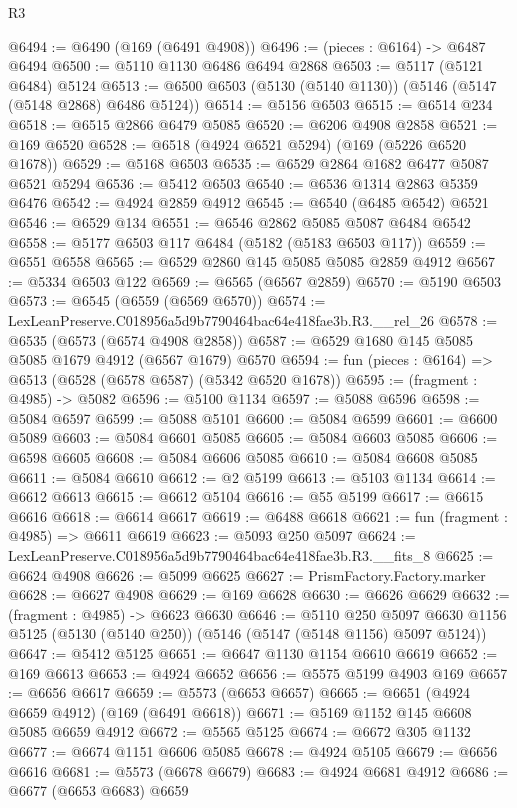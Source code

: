 \begin{lexlean}{R3}
\begin{coremodule}
@6494 := @6490 (@169 (@6491 @4908))
@6496 := (pieces : @6164) -> @6487 @6494
@6500 := @5110 @1130 @6486 @6494 @2868
@6503 := @5117 (@5121 @6484) @5124
@6513 := @6500 @6503 (@5130 (@5140 @1130)) (@5146 (@5147 (@5148 @2868) @6486 @5124))
@6514 := @5156 @6503
@6515 := @6514 @234
@6518 := @6515 @2866 @6479 @5085
@6520 := @6206 @4908 @2858
@6521 := @169 @6520
@6528 := @6518 (@4924 @6521 @5294) (@169 (@5226 @6520 @1678))
@6529 := @5168 @6503
@6535 := @6529 @2864 @1682 @6477 @5087 @6521 @5294
@6536 := @5412 @6503
@6540 := @6536 @1314 @2863 @5359 @6476
@6542 := @4924 @2859 @4912
@6545 := @6540 (@6485 @6542) @6521
@6546 := @6529 @134
@6551 := @6546 @2862 @5085 @5087 @6484 @6542
@6558 := @5177 @6503 @117 @6484 (@5182 (@5183 @6503 @117))
@6559 := @6551 @6558
@6565 := @6529 @2860 @145 @5085 @5085 @2859 @4912
@6567 := @5334 @6503 @122
@6569 := @6565 (@6567 @2859)
@6570 := @5190 @6503
@6573 := @6545 (@6559 (@6569 @6570))
@6574 := LexLeanPreserve.C018956a5d9b7790464bac64e418fae3b.R3.__rel_26
@6578 := @6535 (@6573 (@6574 @4908 @2858))
@6587 := @6529 @1680 @145 @5085 @5085 @1679 @4912 (@6567 @1679) @6570
@6594 := fun (pieces : @6164) => @6513 (@6528 (@6578 @6587) (@5342 @6520 @1678))
@6595 := (fragment : @4985) -> @5082
@6596 := @5100 @1134
@6597 := @5088 @6596
@6598 := @5084 @6597
@6599 := @5088 @5101
@6600 := @5084 @6599
@6601 := @6600 @5089
@6603 := @5084 @6601 @5085
@6605 := @5084 @6603 @5085
@6606 := @6598 @6605
@6608 := @5084 @6606 @5085
@6610 := @5084 @6608 @5085
@6611 := @5084 @6610
@6612 := @2 @5199
@6613 := @5103 @1134
@6614 := @6612 @6613
@6615 := @6612 @5104
@6616 := @55 @5199
@6617 := @6615 @6616
@6618 := @6614 @6617
@6619 := @6488 @6618
@6621 := fun (fragment : @4985) => @6611 @6619
@6623 := @5093 @250 @5097
@6624 := LexLeanPreserve.C018956a5d9b7790464bac64e418fae3b.R3.__fits_8
@6625 := @6624 @4908
@6626 := @5099 @6625
@6627 := PrismFactory.Factory.marker
@6628 := @6627 @4908
@6629 := @169 @6628
@6630 := @6626 @6629
@6632 := (fragment : @4985) -> @6623 @6630
@6646 := @5110
    @250
    @5097
    @6630
    @1156
    @5125
    (@5130 (@5140 @250))
    (@5146 (@5147 (@5148 @1156) @5097 @5124))
@6647 := @5412 @5125
@6651 := @6647 @1130 @1154 @6610 @6619
@6652 := @169 @6613
@6653 := @4924 @6652
@6656 := @5575 @5199 @4903 @169
@6657 := @6656 @6617
@6659 := @5573 (@6653 @6657)
@6665 := @6651 (@4924 @6659 @4912) (@169 (@6491 @6618))
@6671 := @5169 @1152 @145 @6608 @5085 @6659 @4912
@6672 := @5565 @5125
@6674 := @6672 @305 @1132
@6677 := @6674 @1151 @6606 @5085
@6678 := @4924 @5105
@6679 := @6656 @6616
@6681 := @5573 (@6678 @6679)
@6683 := @4924 @6681 @4912
@6686 := @6677 (@6653 @6683) @6659

\end{coremodule}
\end{lexlean}
